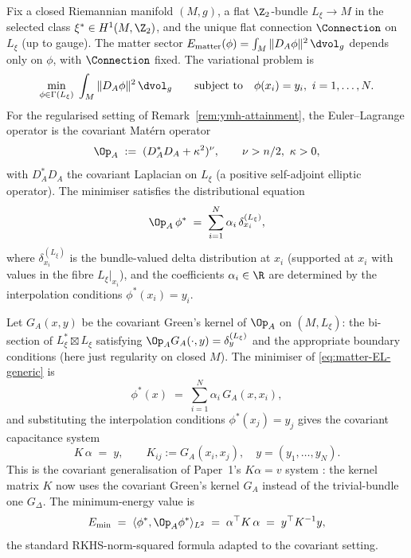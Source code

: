 Fix a closed Riemannian manifold $(M,g)$, a flat $\Z_2$-bundle
$L_\xi\to M$ in the selected class $\xi^*\in H^1(M,\Z_2)$, and the
unique flat connection $\Connection$ on $L_\xi$ (up to gauge). The
matter sector
$E_{\mathrm{matter}}(\phi)=\int_M\|D_A\phi\|^2\,\dvol_g$ depends only
on $\phi$, with $\Connection$ fixed. The variational problem is
\[
   \min_{\phi\in\Gamma(L_\xi)}\;\int_M\|D_A\phi\|^2\,\dvol_g
   \qquad\text{subject to}\quad \phi(x_i)=y_i,\ i=1,\dots,N.
\]
For the regularised setting of Remark~\ref{rem:ymh-attainment}, the
Euler--Lagrange operator is the covariant Mat\'ern operator
\[
   \Op_A \;:=\; (D_A^*D_A + \kappa^2)^\nu,
   \qquad \nu>n/2,\ \kappa>0,
\]
with $D_A^*D_A$ the covariant Laplacian on $L_\xi$ (a positive
self-adjoint elliptic operator). The minimiser satisfies the
distributional equation
\begin{equation}\label{eq:matter-EL-generic}
   \Op_A\,\phi^* \;=\; \sum_{i=1}^N \alpha_i\,\delta_{x_i}^{(L_\xi)},
\end{equation}
where $\delta_{x_i}^{(L_\xi)}$ is the bundle-valued delta
distribution at $x_i$ (supported at $x_i$ with values in the fibre
$L_\xi|_{x_i}$), and the coefficients $\alpha_i\in\R$ are determined
by the interpolation conditions $\phi^*(x_i)=y_i$.

Let $G_A(x,y)$ be the covariant Green's kernel of $\Op_A$ on
$(M,L_\xi)$: the bi-section of $L_\xi^*\boxtimes L_\xi$ satisfying
$\Op_A G_A(\cdot,y) = \delta_y^{(L_\xi)}$ and the appropriate
boundary conditions (here just regularity on closed $M$). The
minimiser of \eqref{eq:matter-EL-generic} is
\[
   \phi^*(x) \;=\; \sum_{i=1}^N \alpha_i\,G_A(x,x_i),
\]
and substituting the interpolation conditions
$\phi^*(x_j)=y_j$ gives the covariant capacitance system
\begin{equation}\label{eq:cov-capacitance}
   K\,\alpha \;=\; y,
   \qquad K_{ij} := G_A(x_i,x_j),\quad y=(y_1,\dots,y_N).
\end{equation}
This is the covariant generalisation of Paper~1's
$K\alpha=v$ system \cite[Theorem~13.3]{Vasii2026Paper1}: the kernel
matrix $K$ now uses the covariant Green's kernel
$G_A$ instead of the trivial-bundle one $G_{\Delta}$. The
minimum-energy value is
\begin{equation}\label{eq:Emin-formula}
   E_{\min} \;=\; \langle\phi^*,\Op_A\phi^*\rangle_{L^2}
   \;=\; \alpha^\top K\,\alpha \;=\; y^\top K^{-1} y,
\end{equation}
the standard RKHS-norm-squared formula adapted to the covariant
setting.

